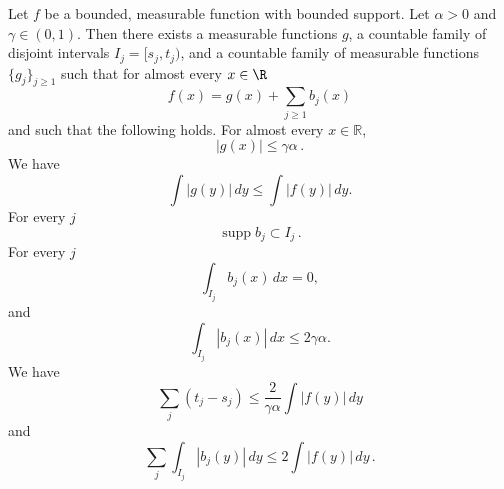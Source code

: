 \begin{lemma}
    \label{Calderon-Zygmund-decomposition}
    Let $f$ be a bounded, measurable function with bounded support. Let $\alpha>0$ and $\gamma\in (0, 1)$. Then there exists a measurable functions $g$, a countable family of disjoint intervals $I_j = [s_j, t_j)$, and a countable family of measurable functions $\{g_j\}_{j\geq 1}$ such that for almost every $x \in \R$
    \begin{equation}
       \label{eq-gb-dec}
       f(x)= g(x)+ \sum_{j\geq 1} b_j(x)
    \end{equation}
    and such that the following holds. For almost every $x\in \mathbb{R}$,
    \begin{equation}
        \label{eq-g-max}
       |g(x)|\leq \gamma\alpha\,.
    \end{equation}
    We have
    \begin{equation}
        \label{eq-g-L1-norm}
        \int |g(y)|\, dy\leq \int |f(y)|\, dy.
    \end{equation}
    For every $j$
    \begin{equation}
        \label{eq-supp-bj}
        \operatorname{supp} b_j \subset I_j\,.
    \end{equation}
    For every $j$
    \begin{equation}
        \label{eq-bad-mean-zero}
        \int_{I_j} b_j(x)\, dx=0,
    \end{equation}
    and
     \begin{equation}
        \label{eq-bj-L1}
        \int_{I_j} |b_j(x)|\, dx \leq 2\gamma\alpha.
    \end{equation}
    We have
    \begin{equation}
        \label{eq-bset-length-sum}
        \sum_j (t_j-s_j)\leq \frac{2}{\gamma\alpha}\int |f(y)|\, dy
    \end{equation}
    and
    \begin{equation}
    \label{eq-b-L1}
    \sum_{j}\int_{I_j} |b_j(y)|\, dy\leq 2 \int |f(y)|\, dy\,.
    \end{equation}
\end{lemma}

